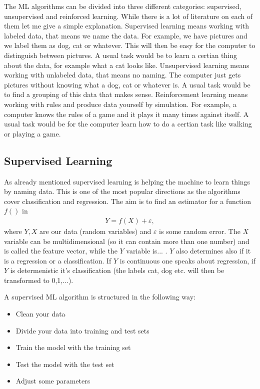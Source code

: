 \documentclass[12pt, letterpaper, twoside]{article}
\begin{document}
The ML algorithms can be divided into three different categories: supervised, unsupervised and reinforced learning. While there is a lot of literature on each of them let me give a simple explanation. Supervised learning means working with labeled data, that means we name the data. For example, we have pictures and we label them as dog, cat or whatever. This will then be easy for the computer to distinguish between pictures. A usual task would be to learn a certian thing about the data, for example what a cat looks like. Unsupervised learning means working with unlabeled data, that means no naming. The computer just gets pictures without knowing what a dog, cat or whatever is. A usual task would be to find a grouping of this data that makes sense. Reinforcement learning means working with rules and produce data yourself by simulation. For example, a computer knows the rules of a game and it plays it many times against itself. A usual task would be for the computer learn how to do a certian task like walking or playing a game.

\subsection{Supervised Learning}

As already mentioned supervised learning is helping the machine to learn things by naming data. This is one of the most popular directions as the algorithms cover classification and regression. The aim is to find an estimator for a function $f()$ in 
\begin{align*}
Y = f(X) + \varepsilon,
\end{align*}
where $Y,X$ are our data (random variables) and $\varepsilon$ is some random error. The $X$ variable can be multidimensional (so it can contain more than one number) and is called the feature vector, while the $Y$ variable is... . $Y$ also determines also if it is a regression or a classification. If $Y$ is continuous one speaks about regression, if $Y$ is determenistic it's classification (the labels cat, dog etc. will then be transformed to 0,1,...). 

 A supervised ML algorithm is structured in the following way:

\begin{itemize}
\item Clean your data
\item Divide your data into training and test sets
\item Train the model with the training set
\item Test the model with the test set
\item Adjust some parameters
\end{itemize}
\end{document}
